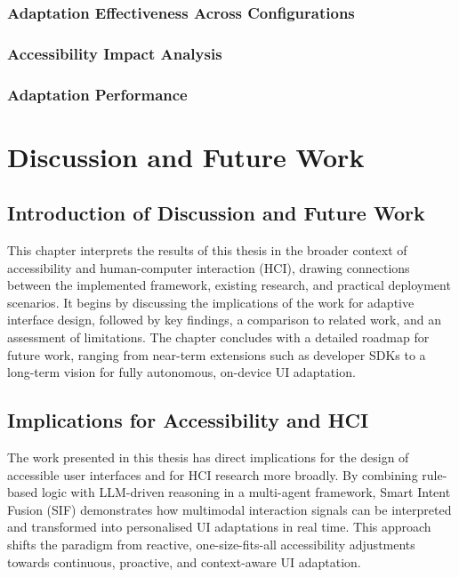 \documentclass[openany]{book}
\begin{document}
    \subsection{Adaptation Effectiveness Across Configurations}
    \subsection{Accessibility Impact Analysis}
    \subsection{Adaptation Performance}


\chapter{Discussion and Future Work}

\section{Introduction of Discussion and Future Work}
This chapter interprets the results of this thesis in the broader context of accessibility and human-computer interaction (HCI), drawing connections between the implemented framework, existing research, and practical deployment scenarios. It begins by discussing the implications of the work for adaptive interface design, followed by key findings, a comparison to related work, and an assessment of limitations. The chapter concludes with a detailed roadmap for future work, ranging from near-term extensions such as developer SDKs to a long-term vision for fully autonomous, on-device UI adaptation.

\section{Implications for Accessibility and HCI}
The work presented in this thesis has direct implications for the design of accessible user interfaces and for HCI research more broadly. By combining rule-based logic with LLM-driven reasoning in a multi-agent framework, Smart Intent Fusion (SIF) demonstrates how multimodal interaction signals can be interpreted and transformed into personalised UI adaptations in real time. This approach shifts the paradigm from reactive, one-size-fits-all accessibility adjustments towards continuous, proactive, and context-aware UI adaptation.
\end{document}
